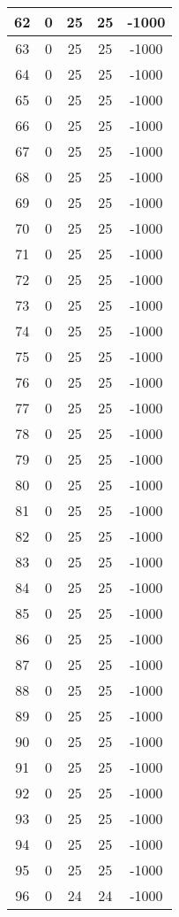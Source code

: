 \documentclass[letterpaper, 12pt]{article}
\begin{document}
\begin{longtable}{|c|c|c|c|c|}
\hline
62 & 0 & 25 & 25 & -1000 \\
\hline
63 & 0 & 25 & 25 & -1000 \\
\hline
64 & 0 & 25 & 25 & -1000 \\
\hline
65 & 0 & 25 & 25 & -1000 \\
\hline
66 & 0 & 25 & 25 & -1000 \\
\hline
67 & 0 & 25 & 25 & -1000 \\
\hline
68 & 0 & 25 & 25 & -1000 \\
\hline
69 & 0 & 25 & 25 & -1000 \\
\hline
70 & 0 & 25 & 25 & -1000 \\
\hline
71 & 0 & 25 & 25 & -1000 \\
\hline
72 & 0 & 25 & 25 & -1000 \\
\hline
73 & 0 & 25 & 25 & -1000 \\
\hline
74 & 0 & 25 & 25 & -1000 \\
\hline
75 & 0 & 25 & 25 & -1000 \\
\hline
76 & 0 & 25 & 25 & -1000 \\
\hline
77 & 0 & 25 & 25 & -1000 \\
\hline
78 & 0 & 25 & 25 & -1000 \\
\hline
79 & 0 & 25 & 25 & -1000 \\
\hline
80 & 0 & 25 & 25 & -1000 \\
\hline
81 & 0 & 25 & 25 & -1000 \\
\hline
82 & 0 & 25 & 25 & -1000 \\
\hline
83 & 0 & 25 & 25 & -1000 \\
\hline
84 & 0 & 25 & 25 & -1000 \\
\hline
85 & 0 & 25 & 25 & -1000 \\
\hline
86 & 0 & 25 & 25 & -1000 \\
\hline
87 & 0 & 25 & 25 & -1000 \\
\hline
88 & 0 & 25 & 25 & -1000 \\
\hline
89 & 0 & 25 & 25 & -1000 \\
\hline
90 & 0 & 25 & 25 & -1000 \\
\hline
91 & 0 & 25 & 25 & -1000 \\
\hline
92 & 0 & 25 & 25 & -1000 \\
\hline
93 & 0 & 25 & 25 & -1000 \\
\hline
94 & 0 & 25 & 25 & -1000 \\
\hline
95 & 0 & 25 & 25 & -1000 \\
\hline
96 & 0 & 24 & 24 & -1000 \\

\end{longtable}
\end{document}
